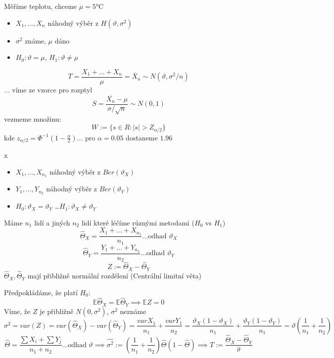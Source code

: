 \documentclass[../main.tex]{subfiles}
\begin{document}
\begin{example}
    Měříme teplotu, chceme $\mu = 5$°C
    \begin{itemize}
        \item $X_1,\dots,X_n$ náhodný výběr z $H(\vartheta,\sigma^2)$
        \item $\sigma^2$ známe, $\mu$ dáno
        \item $H_0 : \vartheta = \mu$, $H_1: \vartheta \neq \mu$
    \end{itemize}
    \[T = \frac{X_1+\dots+X_n}{\mu} = \overline{X}_n \sim N(\vartheta, \sigma^2/n)\]
    ... víme ze vzorce pro rozptyl
    \[S = \frac{\overline{X_n} - \mu}{\sigma/\sqrt{n}} \sim N(0,1)\]
    vezmeme množinu:
    \[W := \{s\in R : |s| > Z_{\alpha/2}\}\]
    kde $z_{\alpha/2} = \Phi^{-1}(1-\frac{\alpha}{2})$... pro $\alpha = 0.05$ dostaneme $1.96$
\end{example}

\begin{example}
    {\color{white} x}
    \begin{itemize}
        \item $X_1,\dots,X_{n_1}$ náhodný výběr z $Ber(\vartheta_X)$
        \item $Y_1,\dots,Y_{n_2}$ náhodný výběr z $Ber(\vartheta_Y)$
        \item $H_0 : \vartheta_X = \vartheta_Y$ \dots $H_1 : \vartheta_X \neq \vartheta_Y$
    \end{itemize}
    Máme $n_1$ lidí a jiných $n_2$ lidí které léčíme různými metodami ($H_0$ vs $H_1$)
    \[\widehat{\Theta}_X = \frac{X_1 +\dots + X_{n_1}}{n_1} \dots \text{odhad }\vartheta_X\]
\[\widehat{\Theta}_Y = \frac{Y_1 +\dots + Y_{n_2}}{n_2} \dots \text{odhad }\vartheta_Y\]
    \[Z := \widehat{\Theta}_X - \widehat{\Theta}_Y\]
    $\widehat{\Theta}_X, \widehat{\Theta}_Y$ mají přibližně normální rozdělení (Centrální limitní věta)

    Předpokládáme, že platí $H_0$:
    \[\mathbb{E}\widehat{\Theta}_X = \mathbb{E}\widehat{\Theta}_Y \implies
    \mathbb{E}Z = 0\]
    Víme, že $Z$ je přibližně $N(0,\sigma^2)$, $\sigma^2$ neznáme
    \[\sigma^2 = var(Z) = var(\widehat{\Theta}_X) - var(\widehat{\Theta}_Y) =
    \frac{var X_1}{n_1} + \frac{var Y_1}{n_2} =
\frac{\vartheta_X(1-\vartheta_X)}{n_1} + \frac{\vartheta_Y(1-\vartheta_Y)}{n_1}
= \vartheta\left(\frac{1}{n_1} + \frac{1}{n_2}\right)\]
    \[\widehat{\Theta} = \frac{\sum X_i + \sum Y_j}{n_1 + n_2} \dots \text{
    odhad }\vartheta \implies \widehat{\sigma^2} := \left(\frac{1}{n_1} +
\frac{1}{n_2}\right) \widehat{\Theta} (1- \widehat{\Theta}) \implies T:=
\frac{\widehat{\Theta}_X - \widehat{\Theta}_Y}{\widehat{\sigma}}\]
\end{example}
\end{document}
